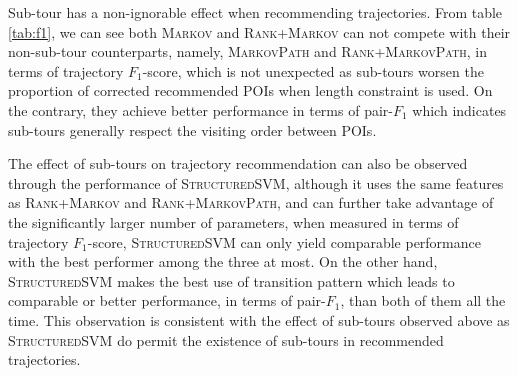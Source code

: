 Sub-tour has a non-ignorable effect when recommending trajectories.
From table \ref{tab:f1}, we can see both \textsc{Markov} and \textsc{Rank+Markov} can not compete with
their non-sub-tour counterparts, namely, \textsc{MarkovPath} and \textsc{Rank+MarkovPath},
in terms of trajectory $F_1$-score, which is not unexpected as sub-tours worsen the proportion of corrected
recommended POIs when length constraint is used.
On the contrary, they achieve better performance in terms of pair-$F_1$ which indicates sub-tours generally
respect the visiting order between POIs.

The effect of sub-tours on trajectory recommendation can also be observed through the performance of \textsc{StructuredSVM},
%
although it uses the same features as \textsc{Rank+Markov} and \textsc{Rank+MarkovPath},
and can further take advantage of the significantly larger number of parameters,
when measured in terms of trajectory $F_1$-score, \textsc{StructuredSVM} can only yield comparable performance
with the best performer among the three at most.
On the other hand, \textsc{StructuredSVM} makes the best use of transition pattern which leads to comparable or
better performance, in terms of pair-$F_1$, than both of them all the time.
This observation is consistent with the effect of sub-tours observed above
as \textsc{StructuredSVM} do permit the existence of sub-tours in recommended trajectories.

